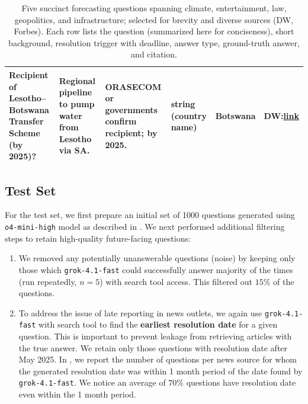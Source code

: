 \begin{table}[h]
\begin{tabularx}{\textwidth}{L L L L L L}
\midrule
Recipient of Lesotho--Botswana Transfer Scheme (by 2025)? & Regional pipeline to pump water from Lesotho via SA. & ORASECOM or governments confirm recipient; by 2025. & string (country name) & Botswana & DW:\newline \href{https://www.dw.com/en/lesotho-urged-to-compensate-villagers-for-water-projects/a-69352942}{link} \\
\bottomrule
\end{tabularx}
\caption{Five succinct forecasting questions spanning climate, entertainment, law, geopolitics, and infrastructure; selected for brevity and diverse sources (DW, Forbes). Each row lists the question (summarized here for conciseness), short background, resolution trigger with deadline, answer type, ground-truth answer, and citation.}
\label{tab:succinct_forecasting_questions_v2}
\end{table}



\subsection{Test Set}
\label{sec:test_set_details}

For the test set, we first prepare an initial set of 1000 questions generated using \texttt{o4-mini-high} model as described in . We next performed additional filtering steps to retain high-quality future-facing questions: 
\begin{enumerate}
    \item We removed any potentially unanswerable questions (noise) by keeping only those which \texttt{grok-4.1-fast} could successfully answer majority of the times (run repeatedly, $n=5$) with search tool access. This filtered out $15\%$ of the questions.
    \item To address the issue of late reporting in news outlets, we again use \texttt{grok-4.1-fast} with search tool to find the \textbf{earliest resolution date} for a given question. This is important to prevent leakage from retrieving articles with the true answer. We retain only those questions with resolution date after May 2025. In , we report the number of questions per news source for whom the generated resolution date was within 1 month period of the date found by \texttt{grok-4.1-fast}. We notice an average of $70\%$ questions have resolution date even within the 1 month period. %
\end{enumerate} 

